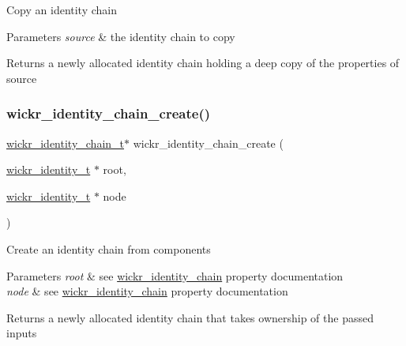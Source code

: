 Copy an identity chain


\begin{DoxyParams}{Parameters}
{\em source} & the identity chain to copy \\
\hline
\end{DoxyParams}
\begin{DoxyReturn}{Returns}
a newly allocated identity chain holding a deep copy of the properties of \textquotesingle{}source\textquotesingle{} 
\end{DoxyReturn}
\mbox{\label{group__wickr__identity_ga79551385194ba6b044b676ce5c7400e6}} 
\subsubsection{\texorpdfstring{wickr\+\_\+identity\+\_\+chain\+\_\+create()}{wickr\_identity\_chain\_create()}}
{\footnotesize\ttfamily \mbox{\hyperlink{structwickr__identity__chain}{wickr\+\_\+identity\+\_\+chain\+\_\+t}}$\ast$ wickr\+\_\+identity\+\_\+chain\+\_\+create (\begin{DoxyParamCaption}\item[{\mbox{\hyperlink{structwickr__identity}{wickr\+\_\+identity\+\_\+t}} $\ast$}]{root,  }\item[{\mbox{\hyperlink{structwickr__identity}{wickr\+\_\+identity\+\_\+t}} $\ast$}]{node }\end{DoxyParamCaption})}

Create an identity chain from components


\begin{DoxyParams}{Parameters}
{\em root} & see \textquotesingle{}\mbox{\hyperlink{structwickr__identity__chain}{wickr\+\_\+identity\+\_\+chain}}\textquotesingle{} property documentation \\
\hline
{\em node} & see \textquotesingle{}\mbox{\hyperlink{structwickr__identity__chain}{wickr\+\_\+identity\+\_\+chain}}\textquotesingle{} property documentation \\
\hline
\end{DoxyParams}
\begin{DoxyReturn}{Returns}
a newly allocated identity chain that takes ownership of the passed inputs 
\end{DoxyReturn}
\mbox{\label{group__wickr__identity_gadbddf6d49fddb2df103486970b3d564b}} 
